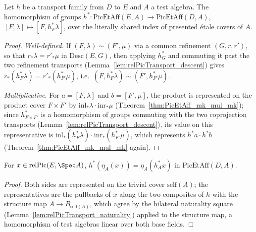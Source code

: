 \begin{definition}
  \label{def:PicEtAffTransport}
  \leanok
  Let \(h\) be a transport family from \(D\) to \(E\) and \(A\) a test algebra. The
  homomorphism of groups
  \(h^{*} \colon \mathrm{PicEtAff}(E, A) \to \mathrm{PicEtAff}(D, A)\),
  \([F, \lambda] \mapsto [F, h_F^{*}\lambda]\), over the literally shared index of
  presented \'etale covers of \(A\).
\end{definition}
\begin{proof}
  \leanok
  \emph{Well-defined.} If \((F, \lambda) \sim (F', \mu)\) via a common refinement
  \((G, r, r')\), so that \(r_{*}\lambda = r'_{*}\mu\) in \(\mathrm{Desc}(E, G)\), then
  applying \(h_G^{*}\) and commuting it past the two refinement transports
  (Lemma~\ref{lem:relPicTransport_descent}) gives
  \(r_{*}(h_F^{*}\lambda) = r'_{*}(h_{F'}^{*}\mu)\), i.e.\
  \((F, h_F^{*}\lambda) \sim (F', h_{F'}^{*}\mu)\).

  \emph{Multiplicative.} For \(a = [F, \lambda]\) and \(b = [F', \mu]\), the product is
  represented on the product cover \(F \times F'\) by
  \(\mathrm{inl}_{*}\lambda \cdot \mathrm{inr}_{*}\mu\)
  (Theorem~\ref{thm:PicEtAff_mk_mul_mk}); since \(h_{F \times F'}^{*}\) is a homomorphism
  of groups commuting with the two coprojection transports
  (Lemma~\ref{lem:relPicTransport_descent}), its value on this representative is
  \(\mathrm{inl}_{*}(h_F^{*}\lambda) \cdot \mathrm{inr}_{*}(h_{F'}^{*}\mu)\), which
  represents \(h^{*}a \cdot h^{*}b\) (Theorem~\ref{thm:PicEtAff_mk_mul_mk} again).
\end{proof}

\begin{theorem}
  \label{thm:PicEtAffTransport_unit}
  \uses{def:PicEtAffTransport, def:PicEtAff_unit}
  \leanok
  For \(x \in \mathrm{relPic}(E, \Spec A)\),
  \(h^{*}(\eta_A(x)) = \eta_A(h_A^{*} x)\) in \(\mathrm{PicEtAff}(D, A)\).
\end{theorem}
\begin{proof}
  \leanok
  Both sides are represented on the trivial cover \(\mathrm{self}(A)\); the representatives
  are the pullbacks of \(x\) along the two composites of \(h\) with the structure map
  \(A \to B_{\mathrm{self}(A)}\), which agree by the bilateral naturality square
  (Lemma~\ref{lem:relPicTransport_naturality}) applied to the structure map, a
  homomorphism of test algebras linear over both base fields.
\end{proof}

